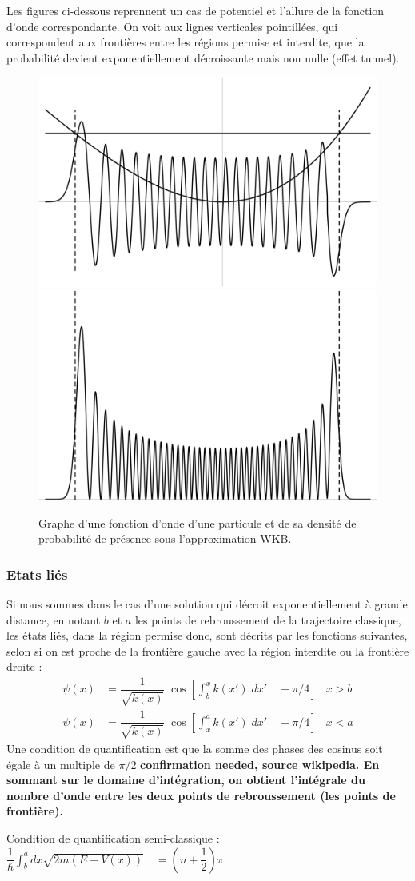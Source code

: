 \documentclass{book}
\begin{document}
Les figures ci-dessous reprennent un cas de potentiel et l'allure de la fonction d'onde correspondante. On voit aux lignes verticales pointillées, qui correspondent aux frontières entre les régions permise et interdite, que la probabilité devient exponentiellement décroissante mais non nulle (effet tunnel).
\begin{figure}[h]
  \centering
  \includegraphics[width=.4\linewidth]{images/WKB_approximation_example.svg.png} \\ \includegraphics[width=.4\linewidth]{images/WKB_approximation_example_2.svg.png}
  \caption{Graphe d'une fonction d'onde d'une particule et de sa densité de probabilité de présence sous l'approximation WKB.}
\end{figure}

\subsubsection{Etats liés}
Si nous sommes dans le cas d'une solution qui décroit exponentiellement à grande distance, en notant $b$ et $a$ les points de rebroussement de la trajectoire classique, les états liés, dans la région permise donc, sont décrits par les fonctions suivantes, selon si on est proche de la frontière gauche avec la région interdite ou la frontière droite :
\begin{equation}
  \begin{array}{llr}
    \psi(x) &= \dfrac{1}{\sqrt{k(x)}} \; \cos\left[\int_b ^x k(x')\; d x' \quad - \pi/4\right] & x>b \\   
    \psi(x) &= \dfrac{1}{\sqrt{k(x)}} \; \cos\left[\int_x ^a k(x')\; d x' \quad + \pi/4\right] & x<a    
  \end{array}
\end{equation}
Une condition de quantification est que la somme des phases des cosinus soit égale à un multiple de $\pi/2$ \bf{confirmation needed, source wikipedia}. En sommant sur le domaine d'intégration, on obtient l'intégrale du nombre d'onde entre les deux points de rebroussement (les points de frontière).
\begin{center}
  Condition de quantification semi-classique : $\dfrac{1}{\hbar} \int_b ^a dx \sqrt{2m(E-V(x))} \quad = \left(n+\dfrac{1}{2}\right) \pi$
\end{center}
\end{document}
